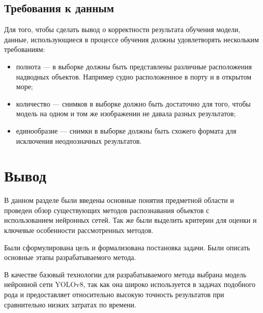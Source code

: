 \subsection{Требования к данным}

Для того, чтобы сделать вывод о корректности результата обучения модели, данные, использующиеся в процессе обучения должны удовлетворять нескольким требованиям:
\begin{itemize}[label=---]
    \item полнота --- в выборке должны быть представлены различные расположения надводных объектов. Например судно расположенное в порту и в открытом море;
    \item количество --- снимков в выборке должно быть достаточно для того, чтобы модель на одном и том же изображении не давала разных результатов;
    \item единообразие --- снимки в выборке должны быть схожего формата для исключения неоднозначных результатов.
\end{itemize}

\section{Вывод}

В данном разделе были введены основные понятия предметной области и проведен обзор существующих методов распознавания объектов с использованием нейронных сетей. Так же были выделить критерии для оценки и ключевые особенности рассмотренных методов.

Были сформулирована цель и формализована постановка задачи. Были описать основные этапы разрабатываемого метода.

В качестве базовый технологии для разрабатываемого метода выбрана модель нейронной сети YOLOv8, так как она широко используется в задачах подобного рода и предоставляет относительно высокую точность результатов при сравнительно низких затратах по времени.